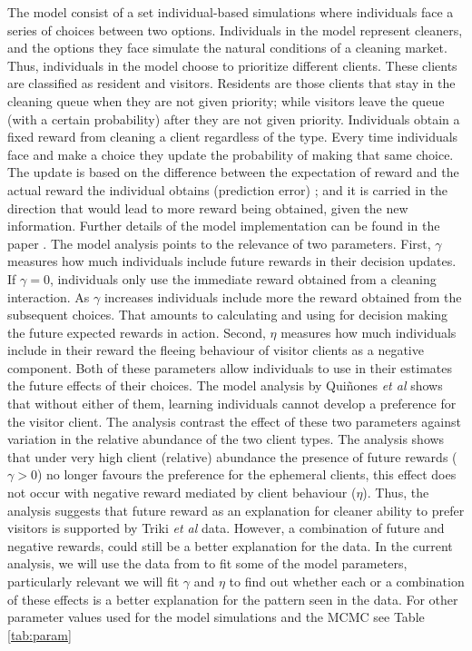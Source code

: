 \documentclass[]{rsos}%
\begin{document}
The model consist of a set individual-based simulations where
individuals face a series of choices between two options. Individuals in
the model represent cleaners, and the options they face simulate the
natural conditions of a cleaning market. Thus, individuals in the model
choose to prioritize different clients. These clients are classified as
resident and visitors. Residents are those clients that stay in the
cleaning queue when they are not given priority; while visitors leave
the queue (with a certain probability) after they are not given
priority. Individuals obtain a fixed reward from cleaning a client
regardless of the type. Every time individuals face and make a choice
they update the probability of making that same choice. The update is
based on the difference between the expectation of reward and the actual
reward the individual obtains (prediction error)
\citep{sutton_Reinforcement_2018, rescorla_Theory_1972}; and it is carried
in the direction that would lead to more reward being obtained, given
the new information. Further details of the model implementation can be
found in the paper \citep{quinones_Reinforcement_2019}. The model analysis
points to the relevance of two parameters. First, \(\gamma\) measures how
much individuals include future rewards in their decision updates. If
\(\gamma=0\), individuals only use the immediate reward obtained from a
cleaning interaction. As \(\gamma\) increases individuals include more the
reward obtained from the subsequent choices. That amounts to calculating
and using for decision making the future expected rewards in action.
Second, \(\eta\) measures how much individuals include in their reward the
fleeing behaviour of visitor clients as a negative component. Both of
these parameters allow individuals to use in their estimates the future
effects of their choices. The model analysis by Quiñones \emph{et al}
\citep{quinones_Reinforcement_2019} shows that without either of them, learning
individuals cannot develop a preference for the visitor client. The
analysis contrast the effect of these two parameters against variation
in the relative abundance of the two client types. The analysis shows
that under very high client (relative) abundance the presence of future
rewards (\(\gamma>0\)) no longer favours the preference for the ephemeral
clients, this effect does not occur with negative reward mediated by
client behaviour (\(\eta\)). Thus, the analysis suggests that future
reward as an explanation for cleaner ability to prefer visitors is
supported by Triki \emph{et al} \citep{triki_Biological_2019} data. However, a combination of
future and negative rewards, could still be a better explanation for the
data. In the current analysis, we will use the data from
\citep{triki_Biological_2019} to fit some of the model parameters, particularly
relevant we will fit \(\gamma\) and \(\eta\) to find out whether each or a
combination of these effects is a better explanation for the pattern
seen in the data. For other parameter values used for the model
simulations and the MCMC see Table \ref{tab:param}
\end{document}
